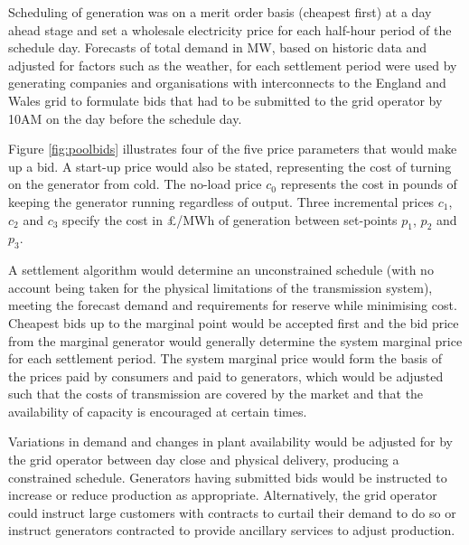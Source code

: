 Scheduling of generation was on a merit order basis (cheapest first) at a day
ahead stage and set a wholesale electricity price for each half-hour period of
the schedule day.  Forecasts of total demand in MW, based on historic data and
adjusted for factors such as the weather, for each settlement period were used
by generating companies and organisations with interconnects to the England
and Wales grid to formulate bids that had to be submitted to the grid operator
by 10AM on the day before the schedule day.


Figure \ref{fig:poolbids} illustrates four of the five price parameters that
would make up a bid.  A start-up price would also be stated, representing the
cost of turning on the generator from cold.  The no-load price $c_{0}$
represents the cost in pounds of keeping the generator running regardless of
output. Three incremental prices $c_1$, $c_2$ and $c_3$ specify the cost in
\pounds/MWh of generation between set-points $p_1$, $p_2$ and $p_3$.

A settlement algorithm would determine an unconstrained schedule (with no
account being taken for the physical limitations of the transmission system),
meeting the forecast demand and requirements for reserve while minimising cost.
Cheapest bids up to the marginal point would be accepted first and the bid price
from the marginal generator would generally determine the system marginal price
for each settlement period.  The system marginal price would form the basis of
the prices paid by consumers and paid to generators, which would be adjusted
such that the costs of transmission are covered by the market and that the
availability of capacity is encouraged at certain times.

Variations in demand and changes in plant availability would be adjusted for by
the grid operator between day close and physical delivery, producing a
constrained schedule. Generators having submitted bids would be instructed to
increase or reduce production as appropriate.  Alternatively, the grid operator
could instruct large customers with contracts to curtail their demand to do so
or instruct generators contracted to provide ancillary services to adjust
production.

